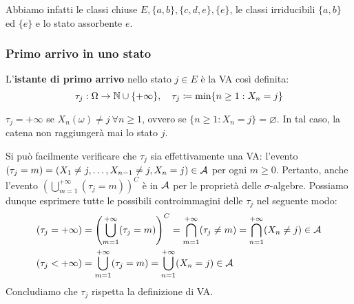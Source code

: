 \begin{ese}
\begin{itemize}
\begin{figure}[H]
		\end{figure}
		Abbiamo infatti le classi chiuse $E, \{a,b\}, \{c,d,e\}, \{e\}$, le classi irriducibili $\{a,b\}$ ed $\{e\}$ e lo stato assorbente $e$.
	\end{itemize}
\end{ese}

\subsubsection{Primo arrivo in uno stato}

\begin{defn}\label{def-ist-pr-arrivo}
	L'\textbf{istante di primo arrivo} nello stato $j \in E$ è la VA così definita:
	$$ \tau_j: \Omega \to \mathbb N \cup \{+\infty\}, \quad
	\tau_j \coloneqq \min\{ n \ge 1 : X_n = j \}
	$$
\end{defn}
\begin{nb}
	$\tau_j = + \infty$ se $X_n(\omega) \neq j \ \forall n \ge 1$, ovvero se $\{ n \ge 1 : X_n=j \} = \varnothing$.
	In tal caso, la catena non raggiungerà mai lo stato $j$.
\end{nb}
Si può facilmente verificare che $\tau_j$ sia effettivamente una VA:
l'evento $(\tau_j = m) = (X_1 \neq j,\dots,X_{n-1} \neq j, X_n = j) \in \mathcal A$ per ogni $m \ge 0$.
Pertanto, anche l'evento $(\bigcup_{m=1}^{+\infty}(\tau_j=m))^C$ è in $\mathcal A$ per le proprietà delle $\sigma$-algebre.
Possiamo dunque esprimere tutte le possibili controimmagini delle $\tau_j$ nel seguente modo:
\begin{align*}
(\tau_j = +\infty) &= \left(\bigcup_{m=1}^{+\infty}(\tau_j=m)\right)^C =
\bigcap_{m=1}^{+\infty}(\tau_j \neq m) = \bigcap_{n=1}^{+\infty}(X_n \neq j) \in \mathcal A \\
(\tau_j < +\infty) &= \bigcup_{m=1}^{+\infty}(\tau_j=m) = \bigcup_{n=1}^{+\infty}(X_n=j) \in \mathcal A
\end{align*}
Concludiamo che $\tau_j$ rispetta la definizione di VA.


